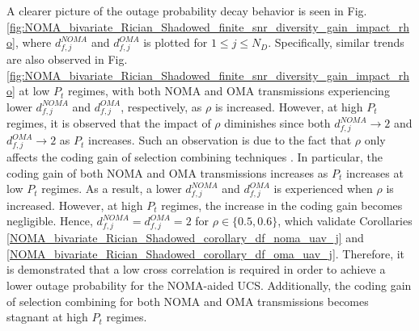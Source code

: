 A clearer picture of the outage probability decay behavior is seen in Fig. \ref{fig:NOMA_bivariate_Rician_Shadowed_finite_snr_diversity_gain_impact_rho}, where $d_{f,j}^{NOMA}$ and $d_{f,j}^{OMA}$ is plotted for $1 \leq j \leq N_D$. Specifically, similar trends are also observed in Fig. \ref{fig:NOMA_bivariate_Rician_Shadowed_finite_snr_diversity_gain_impact_rho} at low $P_t$ regimes, with both NOMA and OMA transmissions experiencing lower $d_{f,j}^{NOMA}$ and $d_{f,j}^{OMA}$, respectively, as $\rho$ is increased. However, at high $P_t$ regimes, it is observed that the impact of $\rho$ diminishes since both $d_{f,j}^{NOMA} \to 2$ and $d_{f,j}^{OMA} \to 2$ as $P_t$ increases. Such an observation is due to the fact that $\rho$ only affects the coding gain of selection combining techniques \cite{el2015mimo}. In particular, the coding gain of both NOMA and OMA transmissions increases as $P_t$ increases at low $P_t$ regimes. As a result, a lower $d_{f,j}^{NOMA}$ and $d_{f,j}^{OMA}$ is experienced when $\rho$ is increased. However, at high $P_t$ regimes, the increase in the coding gain becomes negligible. Hence, $d_{f,j}^{NOMA} = d_{f,j}^{OMA} = 2$ for $\rho \in\{0.5, 0.6\}$, which validate Corollaries \ref{NOMA_bivariate_Rician_Shadowed_corollary_df_noma_uav_j} and \ref{NOMA_bivariate_Rician_Shadowed_corollary_df_oma_uav_j}. Therefore, it is demonstrated that a low cross correlation is required in order to achieve a lower outage probability for the NOMA-aided UCS. Additionally, the coding gain of selection combining for both NOMA and OMA transmissions becomes stagnant at high $P_t$ regimes.  








